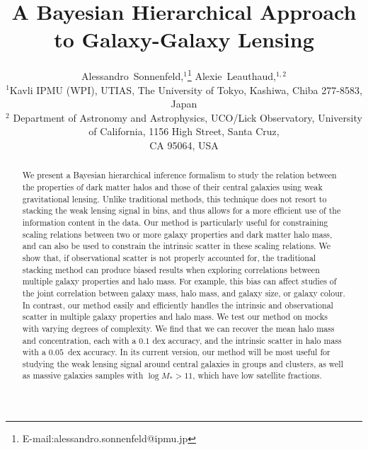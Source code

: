 \documentclass[usenatbib]{mnras}
\def\mstar{M_*}
\begin{document}
\title{A Bayesian Hierarchical Approach to Galaxy-Galaxy Lensing}%
\author[Sonnenfeld \& Leauthaud]{
Alessandro~Sonnenfeld,$^{1}$\thanks{E-mail:alessandro.sonnenfeld@ipmu.jp}
Alexie~Leauthaud,$^{1, 2}$
\\
$^{1}$Kavli IPMU (WPI), UTIAS, The University of Tokyo, Kashiwa, Chiba 277-8583, Japan \\
$^{2}$ Department of Astronomy and Astrophysics, UCO/Lick Observatory, University of California, 1156 High Street, Santa Cruz, \\ CA 95064, USA\\
}

\maketitle

\begin{abstract}
We present a Bayesian hierarchical inference formalism to study the relation between the properties of dark matter halos and those of their central galaxies using weak gravitational lensing. Unlike traditional methods, this technique does not resort to stacking the weak lensing signal in bins, and thus allows for a more efficient use of the information content in the data. Our method is particularly useful for constraining scaling relations between two or more galaxy properties and dark matter halo mass, and can also be used to constrain the intrinsic scatter in these scaling relations. We show that, if observational scatter is not properly accounted for, the traditional stacking method can produce biased results when exploring correlations between multiple galaxy properties and halo mass. For example, this bias can affect studies of the joint correlation between galaxy mass, halo mass, and galaxy size, or galaxy colour. In contrast, our method easily and efficiently handles the intrinsic and observational scatter in multiple galaxy properties and halo mass. We test our method on mocks with varying degrees of complexity. We find that we can recover the mean halo mass and concentration, each with a $0.1$ dex accuracy, and the intrinsic scatter in halo mass with a $0.05$~dex accuracy. In its current version, our method will be most useful for studying the weak lensing signal around central galaxies in groups and clusters, as well as massive galaxies samples with $\log{\mstar} > 11$, which have low satellite fractions.
\end{abstract}
\end{document}
